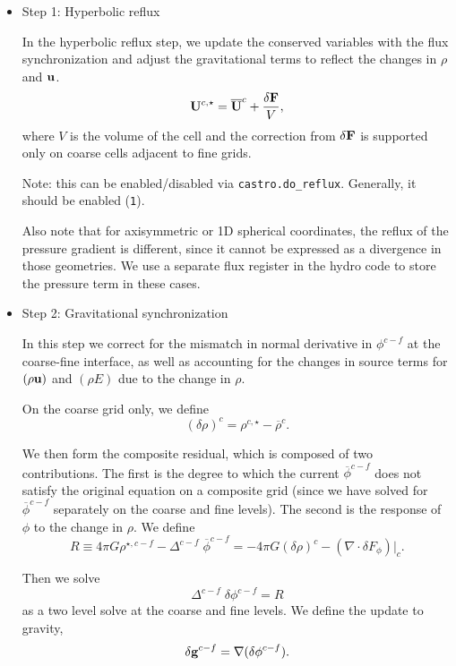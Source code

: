 \begin{itemize}
\item Step 1:  Hyperbolic reflux

In the hyperbolic reflux step, we update the conserved variables with
the flux synchronization and adjust the gravitational terms to reflect
the changes in $\rho$ and ${\bf u}$.
\begin{equation}
{{\bf U}}^{c, \star} = \overline{{\bf U}}^{c} + \frac{\delta{\bf F}}{V},
\end{equation}
where $V$ is the volume of the cell and the correction from
$\delta{\bf F}$ is supported only on coarse cells adjacent to fine grids.

Note: this can be enabled/disabled via {\tt castro.do\_reflux}.  Generally,
it should be enabled ({\tt 1}).

Also note that for axisymmetric or 1D spherical coordinates, the 
reflux of the pressure gradient is different, since it cannot be
expressed as a divergence in those geometries.  We use a separate
flux register in the hydro code to store the pressure term in these
cases.  

\item Step 2:  Gravitational synchronization

In this step we correct for the mismatch in normal derivative in
$\phi^{c-f}$ at the coarse-fine interface, as well as accounting for
the changes in source terms for $(\rho {\bf u})$ and $(\rho E)$ due to the
change in $\rho.$

On the coarse grid only, we define
\begin{equation}
(\delta \rho)^{c} =  \rho^{c, \star} - {\overline{\rho}}^{c}  .
\end{equation}

We then form the composite residual, which is composed of two
contributions.  The first is the degree to which the current $
\overline{\phi}^{c-f}$ does not satisfy the original equation on a
composite grid (since we have solved for $\overline{\phi}^{c-f}$
separately on the coarse and fine levels).  The second is the response
of $\phi$ to the change in $\rho.$ We define
\begin{equation} R \equiv  4 \pi G \rho^{\star,c-f} - \Delta^{c-f} \; \overline{\phi}^{c-f} 
= - 4 \pi G (\delta \rho)^c - (\nabla \cdot \delta F_\phi ) |_c   .
\end{equation}

Then we solve
\begin{equation}
 \Delta^{c-f} \; \delta \phi^{c-f} = R
\label{eq:gravsync}
\end{equation}
as a two level solve at the coarse and fine levels.  
We define the update to gravity,
\begin{equation}
\delta {\bf g}^{c-f} = \nabla (\delta \phi^{c-f})  .
\end{equation}


\end{itemize}
